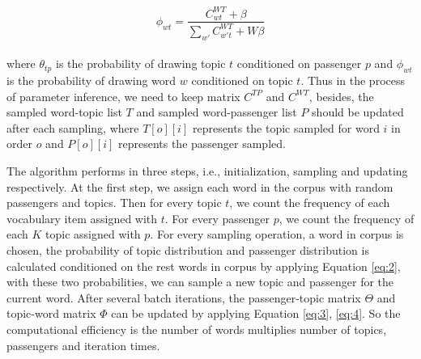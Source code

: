 \documentclass{llncs}
\begin{document}
\begin{equation}
\label{eq:4}
\phi_{wt} = \frac{C_{wt}^{WT}+\beta}{\sum_{w'}C_{w't}^{WT}+W\beta}
\end{equation}\\
where $\theta_{tp}$ is the probability of drawing topic $t$ conditioned on passenger $p$ and $\phi_{wt}$ is the probability of drawing word $w$ conditioned on topic $t$. Thus in the process of parameter inference, we need to keep matrix $C^{TP}$ and $C^{WT}$, besides, the sampled word-topic list $T$ and sampled word-passenger list $P$ should be updated after each sampling, where $T[o][i]$ represents the topic sampled for word $i$ in order $o$ and $P[o][i]$ represents the passenger sampled.\par
The algorithm performs in three steps, i.e., initialization, sampling and updating respectively. At the first step, we assign each word in the corpus with random passengers and topics. Then for every topic $t$, we count the frequency of each vocabulary item assigned with $t$. For every passenger $p$, we count the frequency of each $K$ topic assigned with $p$. For every sampling operation, a word in corpus is chosen, the probability of topic distribution and passenger distribution is calculated conditioned on the rest words in corpus by applying Equation \ref{eq:2}, with these two probabilities, we can sample a new topic and passenger for the current word. After several batch iterations, the passenger-topic matrix $\Theta$ and topic-word matrix $\Phi$ can be updated by applying Equation \ref{eq:3}, \ref{eq:4}. So the computational efficiency is the number of words multiplies number of topics, passengers and iteration times.\par
\end{document}
